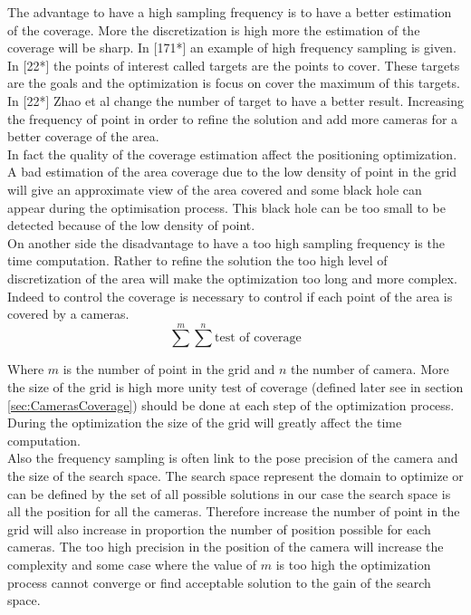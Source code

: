The advantage to have a high sampling frequency is to have a better estimation of the coverage. More the discretization is high more the estimation of the coverage will be sharp. In [171*] an example of high frequency sampling is given. 
In [22*] the points of interest called targets are the points to cover. These targets are the goals and the optimization is focus on cover the maximum of this targets. In [22*] Zhao et al change the number of target to have a better result. Increasing the frequency of point in order to refine the solution and add more cameras for a better coverage of the area.  \\
In fact the quality of the coverage estimation affect the positioning optimization. %
A bad estimation of the area coverage due to the low density of point in the grid will give an approximate view of the area covered and some black hole can appear during the optimisation process. This black hole can be too small to be detected because of the low density of point. 
\\
On another side the disadvantage to have a too high sampling frequency is the time computation. Rather to refine the solution the too high level of discretization of the area will make the optimization too long and more complex. Indeed to control the coverage is necessary to control if each point of the area is covered by a cameras.  
\begin{equation} 
	\sum^m \sum^n \mbox{test of coverage}
\end{equation}

Where $m$ is the number of point in the grid and $n$ the number of camera.  More the size of the grid is high more unity test of coverage (defined later see in section \ref{sec:CamerasCoverage}) should be done at each step of the optimization process. During the optimization the size of the grid will greatly affect the time computation.  \\

Also the frequency sampling is often link to the pose precision of the camera and the size of the search space. The search space represent the domain to optimize or can be defined by the set of all possible solutions in our case the search space is all the position for all the cameras. 
Therefore increase the number of point in the grid will also increase in proportion the number of position possible for each cameras. The too high precision in the position of the camera will increase the complexity and some case where the value of $m$ is too high the optimization process cannot converge or find acceptable solution to the gain of the search space. \\ 


